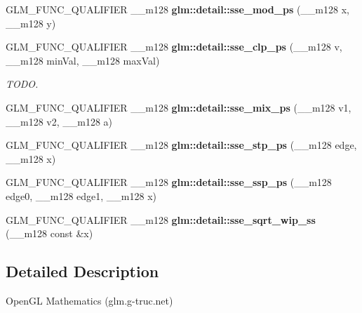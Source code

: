 \begin{DoxyCompactItemize}
\item 
\hypertarget{namespaceglm_1_1detail_a5a9835edaca654da44c7daae89ce5106}{\-G\-L\-M\-\_\-\-F\-U\-N\-C\-\_\-\-Q\-U\-A\-L\-I\-F\-I\-E\-R \-\_\-\-\_\-m128 {\bfseries glm\-::detail\-::sse\-\_\-mod\-\_\-ps} (\-\_\-\-\_\-m128 x, \-\_\-\-\_\-m128 y)}\label{namespaceglm_1_1detail_a5a9835edaca654da44c7daae89ce5106}

\item 
\hypertarget{namespaceglm_1_1detail_a7449dbce48a49880189874273179f3d2}{\-G\-L\-M\-\_\-\-F\-U\-N\-C\-\_\-\-Q\-U\-A\-L\-I\-F\-I\-E\-R \-\_\-\-\_\-m128 {\bfseries glm\-::detail\-::sse\-\_\-clp\-\_\-ps} (\-\_\-\-\_\-m128 v, \-\_\-\-\_\-m128 min\-Val, \-\_\-\-\_\-m128 max\-Val)}\label{namespaceglm_1_1detail_a7449dbce48a49880189874273179f3d2}

\begin{DoxyCompactList}\small\item\em \-T\-O\-D\-O. \end{DoxyCompactList}\item 
\hypertarget{namespaceglm_1_1detail_af1b5b805a3dd439d6fbe92033f4d3bbd}{\-G\-L\-M\-\_\-\-F\-U\-N\-C\-\_\-\-Q\-U\-A\-L\-I\-F\-I\-E\-R \-\_\-\-\_\-m128 {\bfseries glm\-::detail\-::sse\-\_\-mix\-\_\-ps} (\-\_\-\-\_\-m128 v1, \-\_\-\-\_\-m128 v2, \-\_\-\-\_\-m128 a)}\label{namespaceglm_1_1detail_af1b5b805a3dd439d6fbe92033f4d3bbd}

\item 
\hypertarget{namespaceglm_1_1detail_a7287773c37d9f5900db40f7a783f689c}{\-G\-L\-M\-\_\-\-F\-U\-N\-C\-\_\-\-Q\-U\-A\-L\-I\-F\-I\-E\-R \-\_\-\-\_\-m128 {\bfseries glm\-::detail\-::sse\-\_\-stp\-\_\-ps} (\-\_\-\-\_\-m128 edge, \-\_\-\-\_\-m128 x)}\label{namespaceglm_1_1detail_a7287773c37d9f5900db40f7a783f689c}

\item 
\hypertarget{namespaceglm_1_1detail_a66b096ea09da5b585484550d41da1580}{\-G\-L\-M\-\_\-\-F\-U\-N\-C\-\_\-\-Q\-U\-A\-L\-I\-F\-I\-E\-R \-\_\-\-\_\-m128 {\bfseries glm\-::detail\-::sse\-\_\-ssp\-\_\-ps} (\-\_\-\-\_\-m128 edge0, \-\_\-\-\_\-m128 edge1, \-\_\-\-\_\-m128 x)}\label{namespaceglm_1_1detail_a66b096ea09da5b585484550d41da1580}

\item 
\-G\-L\-M\-\_\-\-F\-U\-N\-C\-\_\-\-Q\-U\-A\-L\-I\-F\-I\-E\-R \-\_\-\-\_\-m128 {\bfseries glm\-::detail\-::sse\-\_\-sqrt\-\_\-wip\-\_\-ss} (\-\_\-\-\_\-m128 const \&x)
\end{DoxyCompactItemize}


\subsection{\-Detailed \-Description}
\-Open\-G\-L \-Mathematics (glm.\-g-\/truc.\-net)

